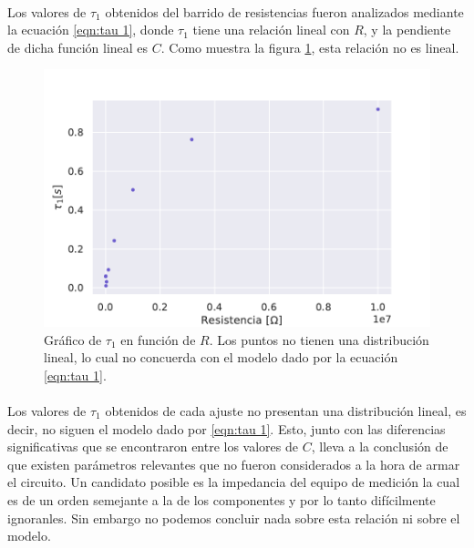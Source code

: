 \paragraph{}
Los valores de $\tau_1$ obtenidos del barrido de resistencias fueron analizados mediante la ecuación \eqref{eqn:tau 1}, donde $\tau_1$ tiene una relación lineal con $R$, y la pendiente de dicha función lineal es $C$. Como muestra la figura \ref{fig:RC tau}, esta relación no es lineal.
\begin{figure} [H]
    \centering
    \includegraphics[scale=0.7]{Figuras/RC/rc_tau.pdf}
    \caption{Gráfico de $\tau_1$ en función de $R$. Los puntos no tienen una distribución lineal, lo cual no concuerda con el modelo dado por la ecuación \eqref{eqn:tau 1}.}
    \label{fig:RC tau}
\end{figure}
\paragraph{}
Los valores de $\tau_1$ obtenidos de cada ajuste no presentan una distribución lineal, es decir, no siguen el modelo dado por \eqref{eqn:tau 1}. Esto, junto con las diferencias significativas que se encontraron entre los valores de $C$, lleva a la conclusión de que existen parámetros relevantes que no fueron considerados a la hora de armar el circuito. Un candidato posible es la impedancia del equipo de medición la cual es de un orden semejante a la de los componentes y por lo tanto difícilmente ignoranles. Sin embargo no podemos concluir nada sobre esta relación ni sobre el modelo.